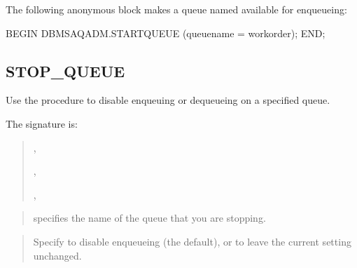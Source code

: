 \documentclass[letterpaper,10pt,english,openany,oneside]{sphinxmanual}
\begin{document}
The following anonymous block makes a queue named  available
for enqueueing:

%
\begin{sphinxVerbatim}[commandchars=\\\{\}]
BEGIN
DBMS\PYGZus{}AQADM.START\PYGZus{}QUEUE
(queue\PYGZus{}name =\PYGZgt{} \PYGZsq{}work\PYGZus{}order);
END;
\end{sphinxVerbatim}

\newpage


\subsection{STOP\_QUEUE}
\label{\detokenize{stop_queue:stop-queue}}\label{\detokenize{stop_queue::doc}}
Use the  procedure to disable enqueuing or dequeueing on a
specified queue.

The signature is:
\begin{quote}

\begin{DUlineblock}{0em}
\item[] 
\item[]
\begin{DUlineblock}{\DUlineblockindent}
\item[] ,
\item[] ,
\item[] ,
\item[] 
\end{DUlineblock}
\end{DUlineblock}
\end{quote}


\begin{quote}

 specifies the name of the queue that you are stopping.
\end{quote}

\begin{quote}

Specify  to disable enqueueing (the default), or  to leave
the current setting unchanged.
\end{quote}
\end{document}
